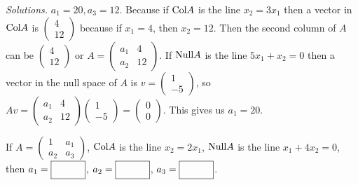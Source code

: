     \ifnum {} {\color{DarkBlue} \textit{Solutions.} $a_1=20, a_3=12$. Because if $\text{Col} A$ is the line $x_2=3x_1$ then a vector in $\text{Col} A$ is $\begin{pmatrix} 4\\12\end{pmatrix}$ because if $x_1=4$, then $x_2=12$. Then the second column of $A$ can be $\begin{pmatrix} 4\\12\end{pmatrix}$ or $A = \begin{pmatrix} a_1&4\\a_2&12\end{pmatrix}$. If $\text{Null} A$ is the line $5x_1+x_2=0$ then a vector in the null space of $A$ is $v = \begin{pmatrix} 1\\-5\end{pmatrix}$, so $Av = \begin{pmatrix}a_1&4\\a_2&12 \end{pmatrix}\begin{pmatrix} 1\\-5\end{pmatrix} = \begin{pmatrix} 0\\0\end{pmatrix}$. This gives us $a_1=20$.
    } 
      
   \fi        
\fi 
\ifnum {}
    If $A = \begin{pmatrix} 1&a_1\\a_2&a_3\end{pmatrix}$, $\text{Col} A$ is the line $x_2=2x_1$, $\text{Null} A$ is the line $x_1+4x_2=0$, then 
    $a_1 = \framebox{\strut\hspace{1.0cm}}$, 
    $a_2 = \framebox{\strut\hspace{1.0cm}}$, 
    $a_3 = \framebox{\strut\hspace{1.0cm}}$. 
    
